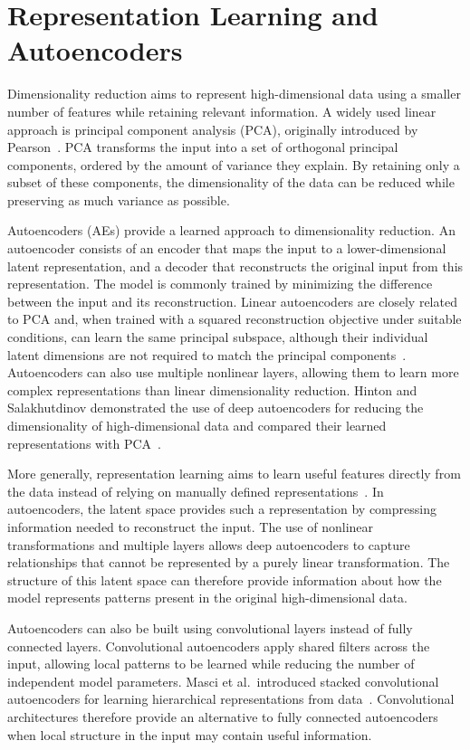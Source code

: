 \section{Representation Learning and Autoencoders}

Dimensionality reduction aims to represent high-dimensional data using a smaller number of features while retaining relevant information. 
A widely used linear approach is principal component analysis (PCA), originally introduced by Pearson~\cite{Pearson1901}. 
PCA transforms the input into a set of orthogonal principal components, ordered by the amount of variance they explain. 
By retaining only a subset of these components, the dimensionality of the data can be reduced while preserving as much variance as possible.

Autoencoders (AEs) provide a learned approach to dimensionality reduction. 
An autoencoder consists of an encoder that maps the input to a lower-dimensional latent representation, and a decoder that reconstructs the original input from this representation. 
The model is commonly trained by minimizing the difference between the input and its reconstruction. 
Linear autoencoders are closely related to PCA and, when trained with a squared reconstruction objective under suitable conditions, can learn the same principal subspace, although their individual latent dimensions are not required to match the principal components~\cite{BaldiHornik1989}. 
Autoencoders can also use multiple nonlinear layers, allowing them to learn more complex representations than linear dimensionality reduction. 
Hinton and Salakhutdinov demonstrated the use of deep autoencoders for reducing the dimensionality of high-dimensional data and compared their learned representations with PCA~\cite{HintonSalakhutdinov2006}.

More generally, representation learning aims to learn useful features directly from the data instead of relying on manually defined representations~\cite{Bengio2013}. 
In autoencoders, the latent space provides such a representation by compressing information needed to reconstruct the input. 
The use of nonlinear transformations and multiple layers allows deep autoencoders to capture relationships that cannot be represented by a purely linear transformation. 
The structure of this latent space can therefore provide information about how the model represents patterns present in the original high-dimensional data.

Autoencoders can also be built using convolutional layers instead of fully connected layers. 
Convolutional autoencoders apply shared filters across the input, allowing local patterns to be learned while reducing the number of independent model parameters. 
Masci et al.\ introduced stacked convolutional autoencoders for learning hierarchical representations from data~\cite{Masci2011}. 
Convolutional architectures therefore provide an alternative to fully connected autoencoders when local structure in the input may contain useful information.

